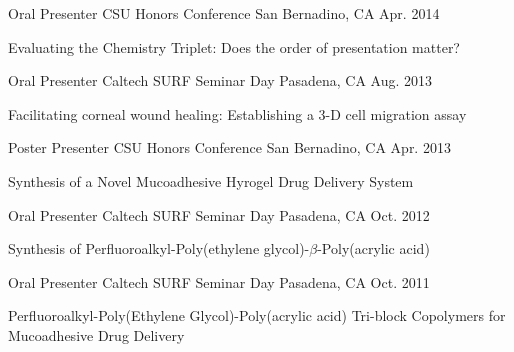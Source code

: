 \begin{cventries}
  \cventry
    {Oral Presenter} %
    {CSU Honors Conference} %
    {San Bernadino, CA} %
    {Apr. 2014} %
    {
      \begin{cvitems} %
        \item { Evaluating the Chemistry Triplet: Does the order of presentation matter?}
      \end{cvitems}
    }


  \cventry
    {Oral Presenter} %
    {Caltech SURF Seminar Day} %
    {Pasadena, CA} %
    {Aug. 2013} %
    {
      \begin{cvitems} %
        \item {Facilitating corneal wound healing: Establishing a 3-D cell migration assay}
      \end{cvitems}
    }

  \cventry
    {Poster Presenter} %
    {CSU Honors Conference} %
    {San Bernadino, CA} %
    {Apr. 2013} %
    {
      \begin{cvitems} %
        \item {Synthesis of a Novel Mucoadhesive Hyrogel Drug Delivery System}
      \end{cvitems}
    }
    
  \cventry
    {Oral Presenter} %
    {Caltech SURF Seminar Day} %
    {Pasadena, CA} %
    {Oct. 2012} %
    {
      \begin{cvitems} %
        \item {Synthesis of Perfluoroalkyl-Poly(ethylene glycol)-$\beta$-Poly(acrylic acid)}
      \end{cvitems}
    }
    
  \cventry
    {Oral Presenter} %
    {Caltech SURF Seminar Day} %
    {Pasadena, CA} %
    {Oct. 2011} %
    {
      \begin{cvitems} %
        \item {Perfluoroalkyl-Poly(Ethylene Glycol)-Poly(acrylic acid) Tri-block Copolymers for Mucoadhesive Drug Delivery}
      \end{cvitems}
    }

    
\end{cventries}
